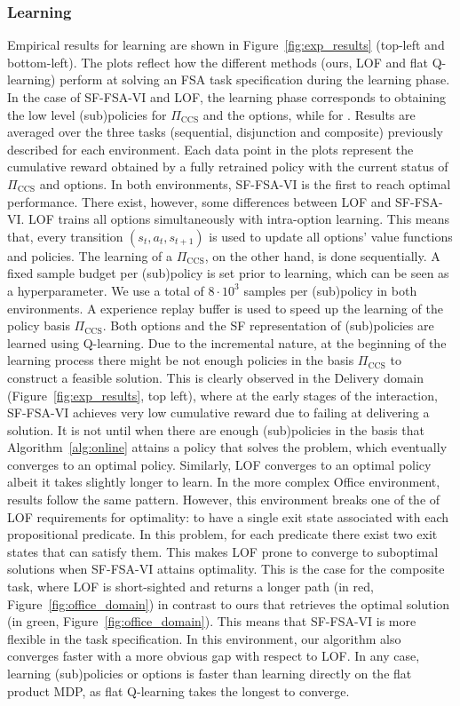 \subsubsection{Learning} Empirical results for learning are shown in Figure~\ref{fig:exp_results} (top-left and bottom-left). The plots reflect how the different methods (ours, LOF and flat Q-learning) perform at solving an FSA task specification during the learning phase. In the case of SF-FSA-VI and LOF, the learning phase corresponds to obtaining the low level (sub)policies for $\Pi_\text{CCS}$ and the options, while for . Results are averaged over the three tasks (sequential, disjunction and composite) previously described for each environment. Each data point in the plots represent the cumulative reward obtained by a fully retrained policy with the current status of $\Pi_\text{CCS}$ and options. In both environments, SF-FSA-VI is the first to reach optimal performance. There exist, however, some differences between LOF and SF-FSA-VI. LOF trains all options simultaneously with intra-option learning. This means that, every transition $(s_t, a_t, s_{t+1})$ is used to update all options' value functions and policies. The learning of a $\Pi_\text{CCS}$, on the other hand, is done sequentially. A fixed sample budget per (sub)policy is set prior to learning, which can be seen as a hyperparameter. We use a total of $8\cdot 10^3$ samples per (sub)policy in both environments. A experience replay buffer is used to speed up the learning of the policy basis $\Pi_\text{CCS}$. Both options and the SF representation of (sub)policies are learned using Q-learning. Due to the incremental nature, at the beginning of the learning process there might be not enough policies in the basis $\Pi_\text{CCS}$ to construct a feasible solution. This is clearly observed in the Delivery domain (Figure~\ref{fig:exp_results}, top left), where at the early stages of the interaction, SF-FSA-VI achieves very low cumulative reward due to failing at delivering a solution. It is not until when there are enough (sub)policies in the basis that Algorithm~\ref{alg:online} attains a policy that solves the problem, which eventually converges to an optimal policy. Similarly, LOF converges to an optimal policy albeit it takes slightly longer to learn. In the more complex Office environment, results follow the same pattern. However, this environment breaks one of the of LOF requirements for optimality: to have a single exit state associated with each propositional predicate. In this problem, for each predicate there exist two exit states that can satisfy them. This makes LOF prone to converge to suboptimal solutions when SF-FSA-VI attains optimality. This is the case for the composite task, where LOF is short-sighted and returns a longer path (in red, Figure~\ref{fig:office_domain}) in contrast to ours that retrieves the optimal solution (in green, Figure~\ref{fig:office_domain}). This means that SF-FSA-VI is more flexible in the task specification. In this environment, our algorithm also converges faster with a more obvious gap with respect to LOF. In any case, learning (sub)policies or options is faster than learning directly on the flat product MDP, as flat Q-learning takes the longest to converge.
